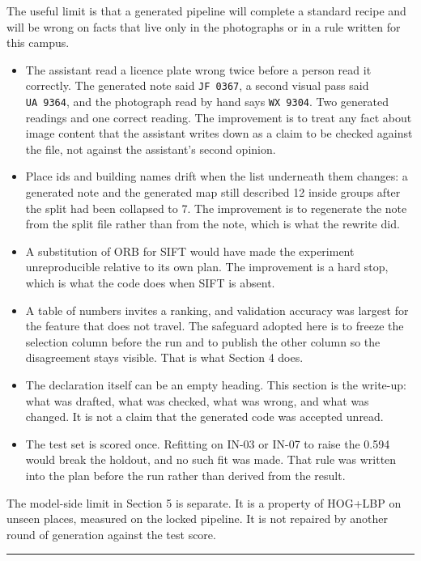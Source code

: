 \documentclass[11pt,a4paper]{article}
\providecommand{\tightlist}{%
  \setlength{\itemsep}{0pt}\setlength{\parskip}{0pt}}
\begin{document}
The useful limit is that a generated pipeline will complete a standard recipe and will be wrong on facts that live only in the photographs or in a rule written for this campus.

\begin{itemize}
\tightlist
\item
  The assistant read a licence plate wrong twice before a person read it correctly. The generated note said \texttt{JF\ 0367}, a second visual pass said \texttt{UA\ 9364}, and the photograph read by hand says \texttt{WX\ 9304}. Two generated readings and one correct reading. The improvement is to treat any fact about image content that the assistant writes down as a claim to be checked against the file, not against the assistant's second opinion.
\item
  Place ids and building names drift when the list underneath them changes: a generated note and the generated map still described 12 inside groups after the split had been collapsed to 7. The improvement is to regenerate the note from the split file rather than from the note, which is what the rewrite did.
\item
  A substitution of ORB for SIFT would have made the experiment unreproducible relative to its own plan. The improvement is a hard stop, which is what the code does when SIFT is absent.
\item
  A table of numbers invites a ranking, and validation accuracy was largest for the feature that does not travel. The safeguard adopted here is to freeze the selection column before the run and to publish the other column so the disagreement stays visible. That is what Section 4 does.
\item
  The declaration itself can be an empty heading. This section is the write-up: what was drafted, what was checked, what was wrong, and what was changed. It is not a claim that the generated code was accepted unread.
\item
  The test set is scored once. Refitting on IN-03 or IN-07 to raise the 0.594 would break the holdout, and no such fit was made. That rule was written into the plan before the run rather than derived from the result.
\end{itemize}

The model-side limit in Section 5 is separate. It is a property of HOG+LBP on unseen places, measured on the locked pipeline. It is not repaired by another round of generation against the test score.

\begin{center}\rule{0.5\linewidth}{0.5pt}\end{center}
\end{document}
